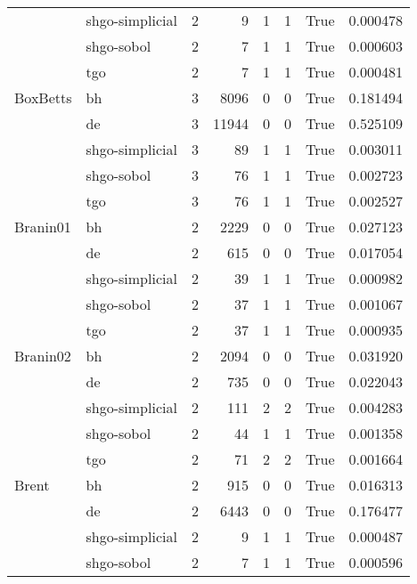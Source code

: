 \begin{longtable}{llrrrrlr}
         & shgo-simplicial &     2 &        9 &      1 &       1 &    True &    0.000478 \\
         & shgo-sobol &     2 &        7 &      1 &       1 &    True &    0.000603 \\
         & tgo &     2 &        7 &      1 &       1 &    True &    0.000481 \\
BoxBetts & bh &     3 &     8096 &      0 &       0 &    True &    0.181494 \\
         & de &     3 &    11944 &      0 &       0 &    True &    0.525109 \\
         & shgo-simplicial &     3 &       89 &      1 &       1 &    True &    0.003011 \\
         & shgo-sobol &     3 &       76 &      1 &       1 &    True &    0.002723 \\
         & tgo &     3 &       76 &      1 &       1 &    True &    0.002527 \\
Branin01 & bh &     2 &     2229 &      0 &       0 &    True &    0.027123 \\
         & de &     2 &      615 &      0 &       0 &    True &    0.017054 \\
         & shgo-simplicial &     2 &       39 &      1 &       1 &    True &    0.000982 \\
         & shgo-sobol &     2 &       37 &      1 &       1 &    True &    0.001067 \\
         & tgo &     2 &       37 &      1 &       1 &    True &    0.000935 \\
Branin02 & bh &     2 &     2094 &      0 &       0 &    True &    0.031920 \\
         & de &     2 &      735 &      0 &       0 &    True &    0.022043 \\
         & shgo-simplicial &     2 &      111 &      2 &       2 &    True &    0.004283 \\
         & shgo-sobol &     2 &       44 &      1 &       1 &    True &    0.001358 \\
         & tgo &     2 &       71 &      2 &       2 &    True &    0.001664 \\
Brent & bh &     2 &      915 &      0 &       0 &    True &    0.016313 \\
         & de &     2 &     6443 &      0 &       0 &    True &    0.176477 \\
         & shgo-simplicial &     2 &        9 &      1 &       1 &    True &    0.000487 \\
         & shgo-sobol &     2 &        7 &      1 &       1 &    True &    0.000596 \\

\end{longtable}
